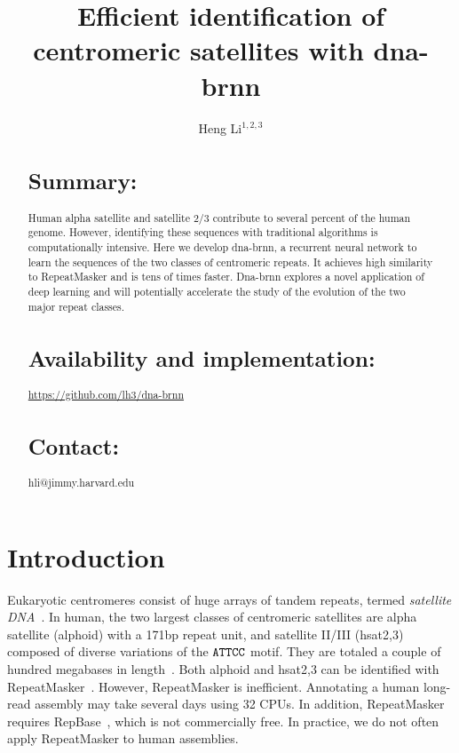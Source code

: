 \documentclass{bioinfo}
\begin{document}

\title{Efficient identification of centromeric satellites with dna-brnn}
\author[Li]{Heng Li$^{1,2,3}$}
\address{$^1$ Department of data sciences, Dana-Farber Cancer Institute, 450 Brookline Ave, Boston, MA 02115, USA\\
$^2$ Department of biomedical informatics, Harvard Medical School, 25 Shattuck Street, Boston, MA 02115, USA\\
$^3$ Broad Institute, 415 Main St, Cambridge, MA 02142, USA}

\maketitle

\begin{abstract}

\section{Summary:} Human alpha satellite and satellite 2/3 contribute to
several percent of the human genome. However, identifying these sequences with
traditional algorithms is computationally intensive. Here we develop dna-brnn,
a recurrent neural network to learn the sequences of the two classes of
centromeric repeats. It achieves high similarity to RepeatMasker and is tens of
times faster. Dna-brnn explores a novel application of deep learning and will
potentially accelerate the study of the evolution of the two major repeat classes.

\section{Availability and implementation:}
\href{https://github.com/lh3/dna-brnn}{https://github.com/lh3/dna-brnn}

\section{Contact:} hli@jimmy.harvard.edu
\end{abstract}

\section{Introduction}

Eukaryotic centromeres consist of huge arrays of tandem repeats, termed
\emph{satellite DNA}~\citep{Garrido-Ramos:2017aa}. In human, the two largest
classes of centromeric satellites are alpha satellite (alphoid) with a 171bp
repeat unit, and satellite II/III (hsat2,3) composed of diverse variations of
the ${\tt ATTCC}$ motif. They are totaled a couple of hundred megabases in
length~\citep{Schneider:2017aa}. Both alphoid and hsat2,3 can be identified
with RepeatMasker~\citep{Tarailo-Graovac:2009aa}. However, RepeatMasker is
inefficient. Annotating a human long-read assembly may take several days using
32 CPUs. In addition, RepeatMasker requires RepBase~\citep{Kapitonov:2008aa},
which is not commercially free. In practice, we do not often apply RepeatMasker
to human assemblies.
\end{document}
